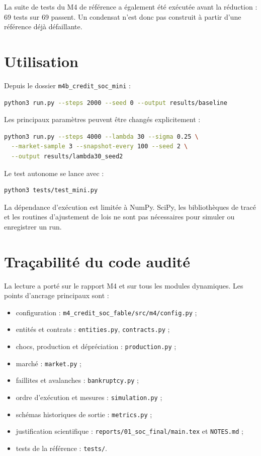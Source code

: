 \documentclass[11pt,a4paper]{article}
\newcommand{\code}[1]{\texttt{#1}}
\begin{document}
La suite de tests du M4 de référence a également été exécutée avant la
réduction : 69 tests sur 69 passent. Un condensat n'est donc pas construit à
partir d'une référence déjà défaillante.

\section{Utilisation}

Depuis le dossier \code{m4b\_credit\_soc\_mini} :

\begin{lstlisting}[language=bash]
python3 run.py --steps 2000 --seed 0 --output results/baseline
\end{lstlisting}

Les principaux paramètres peuvent être changés explicitement :

\begin{lstlisting}[language=bash]
python3 run.py --steps 4000 --lambda 30 --sigma 0.25 \
  --market-sample 3 --snapshot-every 100 --seed 2 \
  --output results/lambda30_seed2
\end{lstlisting}

Le test autonome se lance avec :

\begin{lstlisting}[language=bash]
python3 tests/test_mini.py
\end{lstlisting}

La dépendance d'exécution est limitée à NumPy. SciPy, les bibliothèques de
tracé et les routines d'ajustement de lois ne sont pas nécessaires pour
simuler ou enregistrer un run.

\section{Traçabilité du code audité}

La lecture a porté sur le rapport M4 et sur tous les modules dynamiques. Les
points d'ancrage principaux sont :

\begin{itemize}
\item configuration : \code{m4\_credit\_soc\_fable/src/m4/config.py} ;
\item entités et contrats : \code{entities.py}, \code{contracts.py} ;
\item chocs, production et dépréciation : \code{production.py} ;
\item marché : \code{market.py} ;
\item faillites et avalanches : \code{bankruptcy.py} ;
\item ordre d'exécution et mesures : \code{simulation.py} ;
\item schémas historiques de sortie : \code{metrics.py} ;
\item justification scientifique :
  \code{reports/01\_soc\_final/main.tex} et \code{NOTES.md} ;
\item tests de la référence : \code{tests/}.
\end{itemize}
\end{document}
